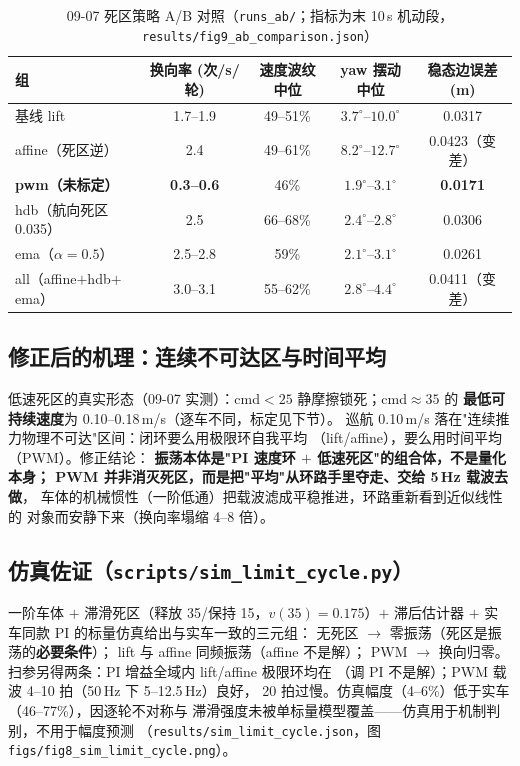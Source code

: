 \documentclass[11pt,a4paper]{ctexart}
\newcommand{\file}[1]{\texttt{#1}}
\newcommand{\degC}{^\circ}
\begin{document}
\begin{table}[H]
\centering\small
\caption{09-07 死区策略 A/B 对照（\file{runs\_ab/}；指标为末 10\,s 机动段，
\file{results/fig9\_ab\_comparison.json}）}
\label{tab:ab}
\begin{tabular}{lcccc}
\toprule
组 & 换向率 (次/s/轮) & 速度波纹中位 & yaw 摆动中位 & 稳态边误差 (m) \\
\midrule
基线 lift & 1.7--1.9 & 49--51\% & $3.7\degC$--$10.0\degC$ & 0.0317 \\
affine（死区逆） & 2.4 & 49--61\% & $8.2\degC$--$12.7\degC$ & 0.0423（变差） \\
\textbf{pwm（未标定）} & \textbf{0.3--0.6} & 46\% & $1.9\degC$--$3.1\degC$ & \textbf{0.0171} \\
hdb（航向死区 0.035） & 2.5 & 66--68\% & $2.4\degC$--$2.8\degC$ & 0.0306 \\
ema（$\alpha=0.5$） & 2.5--2.8 & 59\% & $2.1\degC$--$3.1\degC$ & 0.0261 \\
all（affine$+$hdb$+$ema） & 3.0--3.1 & 55--62\% & $2.8\degC$--$4.4\degC$ & 0.0411（变差） \\
\bottomrule
\end{tabular}
\end{table}

\subsection{修正后的机理：连续不可达区与时间平均}

低速死区的真实形态（09-07 实测）：cmd$<25$ 静摩擦锁死；cmd$\approx35$ 的
\textbf{最低可持续速度}为 0.10--0.18\,m/s（逐车不同，标定见下节）。
巡航 0.10\,m/s 落在"连续推力物理不可达"区间：闭环要么用极限环自我平均
（lift/affine），要么用时间平均（PWM）。修正结论：
\textbf{振荡本体是"PI 速度环 $+$ 低速死区"的组合体，不是量化本身；
PWM 并非消灭死区，而是把"平均"从环路手里夺走、交给 5\,Hz 载波去做}，
车体的机械惯性（一阶低通）把载波滤成平稳推进，环路重新看到近似线性的
对象而安静下来（换向率塌缩 4--8 倍）。

\subsection{仿真佐证（\file{scripts/sim\_limit\_cycle.py}）}

一阶车体 $+$ 滞滑死区（释放 35/保持 15，$v(35)=0.175$）$+$ 滞后估计器
$+$ 实车同款 PI 的标量仿真给出与实车一致的三元组：
无死区 $\to$ 零振荡（死区是振荡的\textbf{必要条件}）；
lift 与 affine 同频振荡（affine 不是解）；
PWM $\to$ 换向归零。扫参另得两条：PI 增益全域内 lift/affine 极限环均在
（调 PI 不是解）；PWM 载波 4--10 拍（50\,Hz 下 5--12.5\,Hz）良好，
20 拍过慢。仿真幅度（4--6\%）低于实车（46--77\%），因逐轮不对称与
滞滑强度未被单标量模型覆盖——仿真用于机制判别，不用于幅度预测
（\file{results/sim\_limit\_cycle.json}，图 \file{figs/fig8\_sim\_limit\_cycle.png}）。
\end{document}
